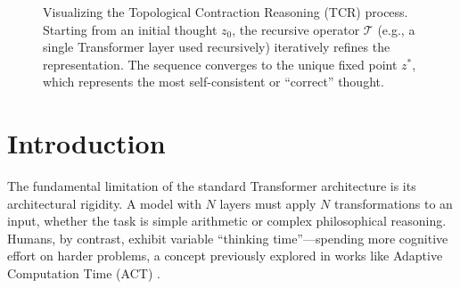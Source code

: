 \documentclass[11pt, a4paper]{article}
\begin{document}
\begin{figure}[H]
\centering
{}
\caption{Visualizing the Topological Contraction Reasoning (TCR) process. Starting from an initial thought $z_0$, the recursive operator $\mathcal{T}$ (e.g., a single Transformer layer used recursively) iteratively refines the representation. The sequence converges to the unique fixed point $z^*$, which represents the most self-consistent or ``correct'' thought.}
\label{fig:tcr_convergence}
\end{figure}

\section{Introduction}
The fundamental limitation of the standard Transformer architecture \cite{vaswani2017attention} is its architectural rigidity. A model with $N$ layers must apply $N$ transformations to an input, whether the task is simple arithmetic or complex philosophical reasoning. Humans, by contrast, exhibit variable ``thinking time''---spending more cognitive effort on harder problems, a concept previously explored in works like Adaptive Computation Time (ACT) \cite{graves2016adaptive}.
\end{document}
